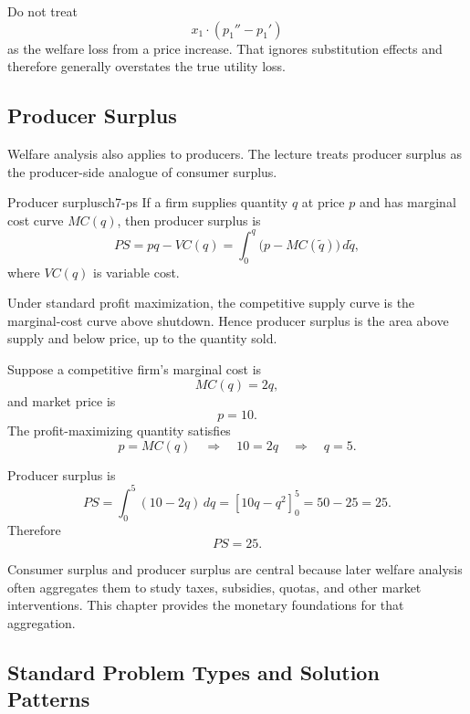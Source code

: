\begin{commonmistake}
Do not treat
\[
x_1 \cdot (p_1''-p_1')
\]
as the welfare loss from a price increase. That ignores substitution effects and therefore generally overstates the true utility loss.
\end{commonmistake}

\subsection{Producer Surplus}

Welfare analysis also applies to producers. The lecture treats producer surplus as the producer-side analogue of consumer surplus.

\begin{definition}{Producer surplus}{ch7-ps}
If a firm supplies quantity $q$ at price $p$ and has marginal cost curve $MC(q)$, then producer surplus is
\[
PS = pq - VC(q)
= \int_0^q \bigl(p-MC(\tilde q)\bigr)\,d\tilde q,
\]
where $VC(q)$ is variable cost.
\end{definition}

Under standard profit maximization, the competitive supply curve is the marginal-cost curve above shutdown. Hence producer surplus is the area above supply and below price, up to the quantity sold.

\begin{examplebox}[title={Worked Example: producer surplus from marginal cost}]
Suppose a competitive firm's marginal cost is
\[
MC(q)=2q,
\]
and market price is
\[
p=10.
\]
The profit-maximizing quantity satisfies
\[
p=MC(q)
\quad \Longrightarrow \quad
10=2q
\quad \Longrightarrow \quad
q=5.
\]

Producer surplus is
\[
PS=\int_0^5 (10-2q)\,dq
= \left[10q-q^2\right]_0^5
=50-25
=25.
\]
Therefore
\[
\boxed{PS=25.}
\]
\end{examplebox}

\begin{policynote}
Consumer surplus and producer surplus are central because later welfare analysis often aggregates them to study taxes, subsidies, quotas, and other market interventions. This chapter provides the monetary foundations for that aggregation.
\end{policynote}

\subsection{Standard Problem Types and Solution Patterns}

